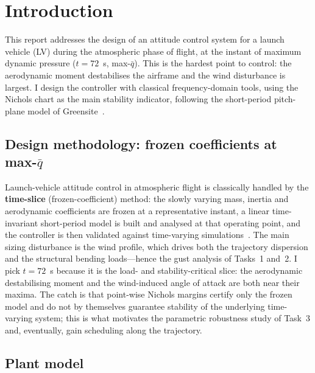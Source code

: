 \documentclass[../main.tex]{subfiles}
\begin{document}
\section{Introduction}\label{sec:intro}

This report addresses the design of an attitude control system for a launch
vehicle (LV) during the atmospheric phase of flight, at the instant of maximum
dynamic pressure ($t = 72$~s, max-$\bar q$). This is the hardest point to
control: the aerodynamic moment destabilises the airframe and the wind
disturbance is largest. I design the controller with classical
frequency-domain tools, using the Nichols chart as the main stability
indicator, following the short-period pitch-plane model of
Greensite~\cite{greensite_cr826}.

\subsection{Design methodology: frozen coefficients at max-$\bar q$}

Launch-vehicle attitude control in atmospheric flight is classically handled by
the \textbf{time-slice} (frozen-coefficient) method: the slowly varying mass,
inertia and aerodynamic coefficients are frozen at a representative instant, a
linear time-invariant short-period model is built and analysed at that operating
point, and the controller is then validated against time-varying
simulations~\cite[Sec.~2]{greensite_cr826}. The main sizing disturbance is
the wind profile, which drives both the trajectory dispersion and the structural
bending loads---hence the gust analysis of Tasks~1 and~2. I pick $t = 72$~s
because it is the load- and stability-critical slice: the aerodynamic
destabilising moment and the wind-induced angle of attack are both near their
maxima. The catch is that point-wise Nichols margins certify only the frozen
model and do not by themselves guarantee stability of the underlying
time-varying system; this is what motivates the parametric robustness study of
Task~3 and, eventually, gain scheduling along the trajectory.

\subsection{Plant model}
\end{document}
